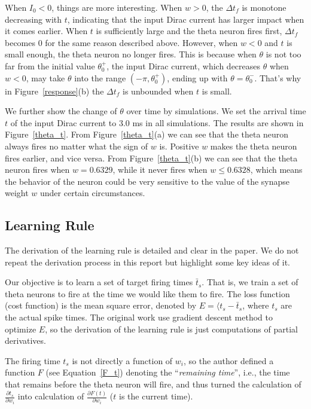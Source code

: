 When $I_0 < 0$, things are more interesting. When $w > 0$, the $\Delta t_f$ is monotone decreasing
with $t$, indicating that the input Dirac current has larger impact when it comes earlier.
When $t$ is sufficiently large and the theta neuron fires first, 
$\Delta t_f$ becomes $0$ for the same reason described above.
However, when $w < 0$ and $t$ is small enough, the theta neuron no longer fires. This is because
when $\theta$ is not too far from the initial value $\theta_0^+$, the input Dirac current, which decreases
$\theta$ when $w < 0$, may take $\theta$ into the range $(-\pi, \theta_0^+)$, ending up with
$\theta = \theta_0^-$. That's why in Figure~\ref{response}(b) the $\Delta t_f$ is unbounded when $t$ is small.


We further show the change of $\theta$ over time by simulations.
We set the arrival time $t$ of the input Dirac current to $3.0$ ms in all simulations.
The results are shown in Figure~\ref{theta_t}.
From Figure~\ref{theta_t}(a) we can see that the theta neuron always fires no matter what the sign
of $w$ is. Positive $w$ makes the theta neuron fires earlier, and vice versa. 
From Figure~\ref{theta_t}(b) we can see that the theta neuron fires when $w=0.6329$, while it never
fires when $w \leq 0.6328$, which means the behavior of the neuron could be very sensitive to the value of
the synapse weight $w$ under certain circumstances.


\subsection{Learning Rule}

The derivation of the learning rule is detailed and clear in the paper. 
We do not repeat the derivation process in this report but highlight some key ideas of it.

Our objective is to learn a set of target firing times $\bar t_s$. That is, we train a set of theta neurons
to fire at the time we would like them to fire. The loss function (cost function) is the mean square error,
denoted by $E = \langle t_s - \bar {t}_s$, where $t_s$ are the actual spike times.
The original work use gradient descent method to optimize $E$, so the derivation of the learning rule
is just computations of partial derivatives.

The firing time $t_s$ is not directly a function of $w_i$, so the author defined a function $F$ 
(see Equation~\ref{F_t}) 
denoting the ``\emph{remaining time}'', i.e., the time that remains before the theta neuron will fire, and thus turned
the calculation of $\frac{\partial t_s}{\partial w_i}$ into calculation of $\frac{\partial F(t)}{\partial w_i}$
($t$ is the current time). 

